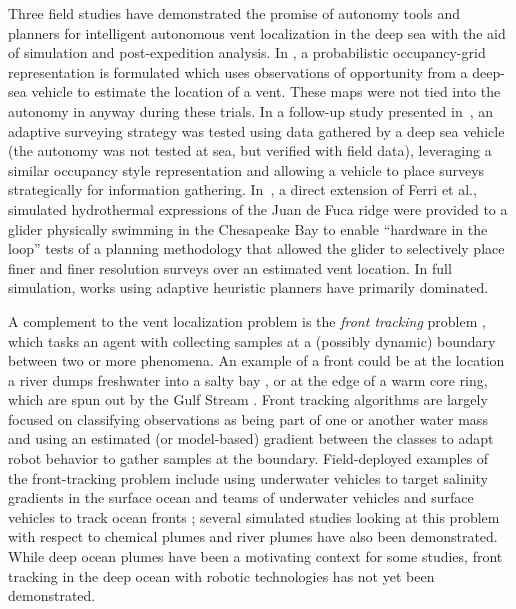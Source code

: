 Three field studies have demonstrated the promise of autonomy tools and planners for intelligent autonomous vent localization in the deep sea with the aid of simulation and post-expedition analysis. In \cite{jakuba2007stochastic}, a probabilistic occupancy-grid representation is formulated which uses observations of opportunity from a deep-sea vehicle to estimate the location of a vent. These maps were not tied into the autonomy in anyway during these trials. In a follow-up study presented in~\cite{ferri2010novel}, an adaptive surveying strategy was tested using data gathered by a deep sea vehicle (the autonomy was not tested at sea, but verified with field data), leveraging a similar occupancy style representation and allowing a vehicle to place surveys strategically for information gathering. In~\cite{branch2020demonstration}, a direct extension of Ferri et al., simulated hydrothermal expressions of the Juan de Fuca ridge were provided to a glider physically swimming in the Chesapeake Bay to enable ``hardware in the loop'' tests of a planning methodology that allowed the glider to selectively place finer and finer resolution surveys over an estimated vent location. In full simulation, works using adaptive heuristic planners \autocite{wang20203,pang2010plume} have primarily dominated.

A complement to the vent localization problem is the \emph{front tracking} problem  \autocite{chen2019odor}, which tasks an agent with collecting samples at a (possibly dynamic) boundary between two or more phenomena. An example of a front could be at the location a river dumps freshwater into a salty bay \autocite{mcclimans1988estuarine}, or at the edge of a warm core ring, which are spun out by the Gulf Stream \autocite{cushman1985oscillations}. Front tracking algorithms are largely focused on classifying observations as being part of one or another water mass and using an estimated (or model-based) gradient between the classes to adapt robot behavior to gather samples at the boundary. Field-deployed examples of the front-tracking problem include using underwater vehicles to target salinity gradients in the surface ocean \autocite{belkin2018new} and teams of underwater vehicles and surface vehicles to track ocean fronts \autocite{mccammon2021ocean}; several simulated studies looking at this problem with respect to chemical plumes \autocite{wang2019dynamic,li2014multi} and river plumes \autocite{teixeira20213d} have also been demonstrated. While deep ocean plumes have been a motivating context for some studies, front tracking in the deep ocean with robotic technologies has not yet been demonstrated.

